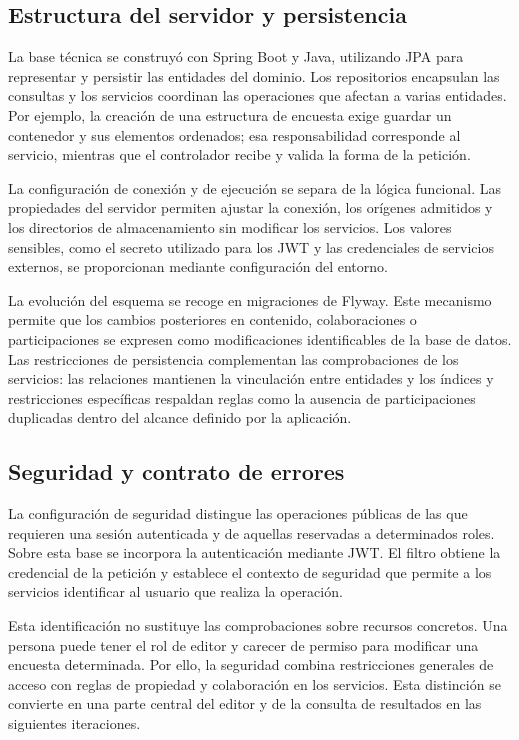 \documentclass[11pt,a4paper]{report}
\newcommand{\code}[1]{\texttt{\small\detokenize{#1}}}
\begin{document}
\subsection{Estructura del servidor y persistencia}

La base técnica se construyó con Spring Boot y Java, utilizando JPA para representar y persistir las entidades del dominio. Los repositorios encapsulan las consultas y los servicios coordinan las operaciones que afectan a varias entidades. Por ejemplo, la creación de una estructura de encuesta exige guardar un contenedor y sus elementos ordenados; esa responsabilidad corresponde al servicio, mientras que el controlador recibe y valida la forma de la petición.

La configuración de conexión y de ejecución se separa de la lógica funcional. Las propiedades del servidor permiten ajustar la conexión, los orígenes admitidos y los directorios de almacenamiento sin modificar los servicios. Los valores sensibles, como el secreto utilizado para los JWT y las credenciales de servicios externos, se proporcionan mediante configuración del entorno.

La evolución del esquema se recoge en migraciones de Flyway. Este mecanismo permite que los cambios posteriores en contenido, colaboraciones o participaciones se expresen como modificaciones identificables de la base de datos. Las restricciones de persistencia complementan las comprobaciones de los servicios: las relaciones mantienen la vinculación entre entidades y los índices y restricciones específicas respaldan reglas como la ausencia de participaciones duplicadas dentro del alcance definido por la aplicación.

\subsection{Seguridad y contrato de errores}

La configuración de seguridad distingue las operaciones públicas de las que requieren una sesión autenticada y de aquellas reservadas a determinados roles. Sobre esta base se incorpora la autenticación mediante JWT. El filtro \code{JwtAuthenticationFilter} obtiene la credencial de la petición y establece el contexto de seguridad que permite a los servicios identificar al usuario que realiza la operación.

Esta identificación no sustituye las comprobaciones sobre recursos concretos. Una persona puede tener el rol de editor y carecer de permiso para modificar una encuesta determinada. Por ello, la seguridad combina restricciones generales de acceso con reglas de propiedad y colaboración en los servicios. Esta distinción se convierte en una parte central del editor y de la consulta de resultados en las siguientes iteraciones.
\end{document}
